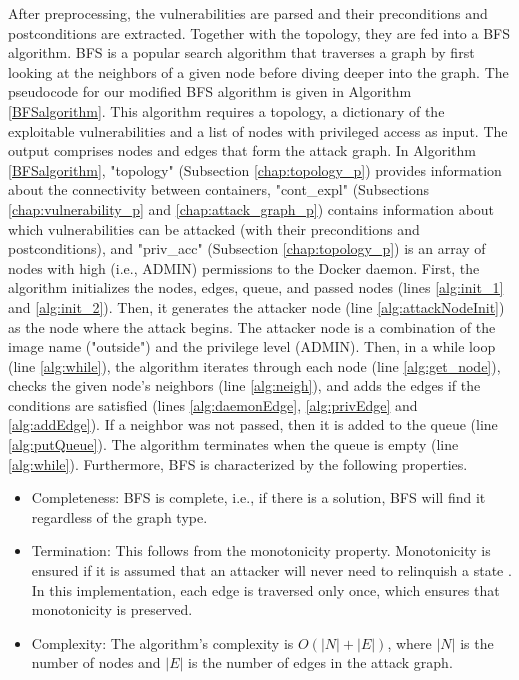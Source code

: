 After preprocessing, the vulnerabilities are parsed and their preconditions and postconditions are extracted. Together with the topology, they are fed into a BFS algorithm. BFS is a popular search algorithm that traverses a graph by first looking at the neighbors of a given node before diving deeper into the graph. The pseudocode for our modified BFS algorithm is given in Algorithm \ref{BFSalgorithm}. This algorithm requires a topology, a dictionary of the exploitable vulnerabilities and a list of nodes with privileged access as input. The output comprises nodes and edges that form the attack graph. In Algorithm \ref{BFSalgorithm}, "topology" (Subsection \ref{chap:topology_p}) provides information about the connectivity between containers, "cont\_expl" (Subsections \ref{chap:vulnerability_p} and \ref{chap:attack_graph_p}) contains information about which vulnerabilities can be attacked (with their preconditions and postconditions), and "priv\_acc" (Subsection \ref{chap:topology_p}) is an array of nodes with high (i.e., ADMIN) permissions to the Docker daemon. First, the algorithm initializes the nodes, edges, queue, and passed nodes (lines \ref{alg:init_1} and \ref{alg:init_2}). Then, it generates the attacker node (line \ref{alg:attackNodeInit}) as the node where the attack begins. The attacker node is a combination of the image name ("outside") and the privilege level (ADMIN). Then, in a while loop (line \ref{alg:while}), the algorithm iterates through each node (line \ref{alg:get_node}), checks the given node's neighbors (line \ref{alg:neigh}), and adds the edges if the conditions are satisfied (lines \ref{alg:daemonEdge}, \ref{alg:privEdge} and \ref{alg:addEdge}). If a neighbor was not passed, then it is added to the queue (line \ref{alg:putQueue}). The algorithm terminates when the queue is empty (line \ref{alg:while}). Furthermore, BFS is characterized by the following properties.


\begin{itemize}
	\item Completeness: BFS is complete, i.e., if there is a solution, BFS will find it regardless of the graph type.
	\item Termination: This follows from the monotonicity property. Monotonicity is ensured if it is assumed that an attacker will never need to relinquish a state \cite{ingols2006practical, ou2006scalable, ammann2002scalable}. In this implementation, each edge is traversed only once, which ensures that monotonicity is preserved.
	\item  Complexity: The algorithm's complexity is $O(|N| + |E|)$, where $|N|$ is the number of nodes and $|E|$ is the number of edges in the attack graph.
\end{itemize}



